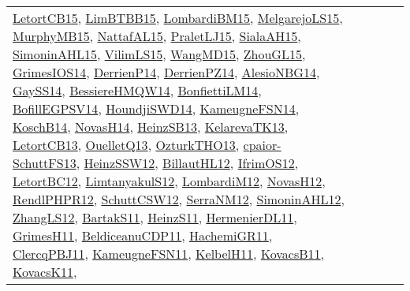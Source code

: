{\begin{longtable}{lp{3cm}>{\raggedright}p{6cm}>{\raggedright}p{6cm}p{8cm}}
\href{articles/LetortCB15.pdf}{LetortCB15}\cite{LetortCB15}, \href{papers/LimBTBB15.pdf}{LimBTBB15}\cite{LimBTBB15}, \href{papers/LombardiBM15.pdf}{LombardiBM15}\cite{LombardiBM15}, \href{papers/MelgarejoLS15.pdf}{MelgarejoLS15}\cite{MelgarejoLS15}, \href{papers/MurphyMB15.pdf}{MurphyMB15}\cite{MurphyMB15}, \href{articles/NattafAL15.pdf}{NattafAL15}\cite{NattafAL15}, \href{papers/PraletLJ15.pdf}{PraletLJ15}\cite{PraletLJ15}, \href{papers/SialaAH15.pdf}{SialaAH15}\cite{SialaAH15}, \href{articles/SimoninAHL15.pdf}{SimoninAHL15}\cite{SimoninAHL15}, \href{papers/VilimLS15.pdf}{VilimLS15}\cite{VilimLS15}, \href{articles/WangMD15.pdf}{WangMD15}\cite{WangMD15}, \href{papers/ZhouGL15.pdf}{ZhouGL15}\cite{ZhouGL15}, \href{articles/GrimesIOS14.pdf}{GrimesIOS14}\cite{GrimesIOS14}, \href{papers/DerrienP14.pdf}{DerrienP14}\cite{DerrienP14}, \href{papers/DerrienPZ14.pdf}{DerrienPZ14}\cite{DerrienPZ14}, \href{papers/AlesioNBG14.pdf}{AlesioNBG14}\cite{AlesioNBG14}, \href{papers/GaySS14.pdf}{GaySS14}\cite{GaySS14}, \href{papers/BessiereHMQW14.pdf}{BessiereHMQW14}\cite{BessiereHMQW14}, \href{papers/BonfiettiLM14.pdf}{BonfiettiLM14}\cite{BonfiettiLM14}, \href{papers/BofillEGPSV14.pdf}{BofillEGPSV14}\cite{BofillEGPSV14}, \href{papers/HoundjiSWD14.pdf}{HoundjiSWD14}\cite{HoundjiSWD14}, \href{articles/KameugneFSN14.pdf}{KameugneFSN14}\cite{KameugneFSN14}, \href{papers/KoschB14.pdf}{KoschB14}\cite{KoschB14}, \href{articles/NovasH14.pdf}{NovasH14}\cite{NovasH14}, \href{articles/HeinzSB13.pdf}{HeinzSB13}\cite{HeinzSB13}, \href{papers/KelarevaTK13.pdf}{KelarevaTK13}\cite{KelarevaTK13}, \href{papers/LetortCB13.pdf}{LetortCB13}\cite{LetortCB13}, \href{papers/OuelletQ13.pdf}{OuelletQ13}\cite{OuelletQ13}, \href{articles/OzturkTHO13.pdf}{OzturkTHO13}\cite{OzturkTHO13}, \href{papers/cpaior-SchuttFS13.pdf}{cpaior-SchuttFS13}\cite{cpaior-SchuttFS13}, \href{articles/HeinzSSW12.pdf}{HeinzSSW12}\cite{HeinzSSW12}, \href{papers/BillautHL12.pdf}{BillautHL12}\cite{BillautHL12}, \href{papers/IfrimOS12.pdf}{IfrimOS12}\cite{IfrimOS12}, \href{papers/LetortBC12.pdf}{LetortBC12}\cite{LetortBC12}, \href{articles/LimtanyakulS12.pdf}{LimtanyakulS12}\cite{LimtanyakulS12}, \href{articles/LombardiM12.pdf}{LombardiM12}\cite{LombardiM12}, \href{articles/NovasH12.pdf}{NovasH12}\cite{NovasH12}, \href{papers/RendlPHPR12.pdf}{RendlPHPR12}\cite{RendlPHPR12}, \href{papers/SchuttCSW12.pdf}{SchuttCSW12}\cite{SchuttCSW12}, \href{papers/SerraNM12.pdf}{SerraNM12}\cite{SerraNM12}, \href{papers/SimoninAHL12.pdf}{SimoninAHL12}\cite{SimoninAHL12}, \href{papers/ZhangLS12.pdf}{ZhangLS12}\cite{ZhangLS12}, \href{articles/BartakS11.pdf}{BartakS11}\cite{BartakS11}, \href{papers/HeinzS11.pdf}{HeinzS11}\cite{HeinzS11}, \href{papers/HermenierDL11.pdf}{HermenierDL11}\cite{HermenierDL11}, \href{papers/GrimesH11.pdf}{GrimesH11}\cite{GrimesH11}, \href{articles/BeldiceanuCDP11.pdf}{BeldiceanuCDP11}\cite{BeldiceanuCDP11}, \href{articles/HachemiGR11.pdf}{HachemiGR11}\cite{HachemiGR11}, \href{papers/ClercqPBJ11.pdf}{ClercqPBJ11}\cite{ClercqPBJ11}, \href{papers/KameugneFSN11.pdf}{KameugneFSN11}\cite{KameugneFSN11}, \href{articles/KelbelH11.pdf}{KelbelH11}\cite{KelbelH11}, \href{articles/KovacsB11.pdf}{KovacsB11}\cite{KovacsB11}, \href{articles/KovacsK11.pdf}{KovacsK11}\cite{KovacsK11}, 
\end{longtable}}
